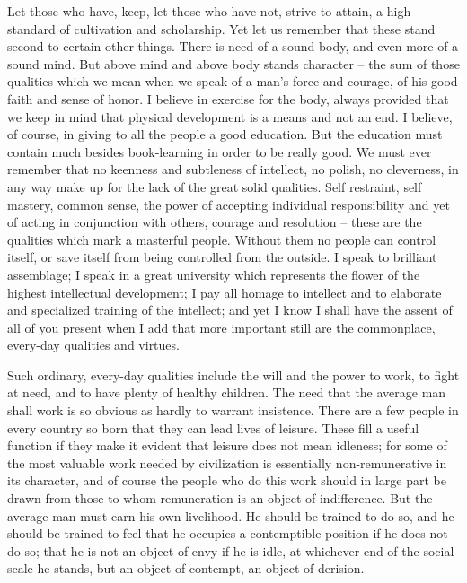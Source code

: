 \documentclass[a4paper]{amsbook}
\begin{document}
Let those who have, keep, let those who have not, strive to attain, a high standard of cultivation and scholarship. Yet let us remember that these stand second to certain other things. There is need of a sound body, and even more of a sound mind. But above mind and above body stands character – the sum of those qualities which we mean when we speak of a man's force and courage, of his good faith and sense of honor. I believe in exercise for the body, always provided that we keep in mind that physical development is a means and not an end. I believe, of course, in giving to all the people a good education. But the education must contain much besides book-learning in order to be really good. We must ever remember that no keenness and subtleness of intellect, no polish, no cleverness, in any way make up for the lack of the great solid qualities. Self restraint, self mastery, common sense, the power of accepting individual responsibility and yet of acting in conjunction with others, courage and resolution – these are the qualities which mark a masterful people. Without them no people can control itself, or save itself from being controlled from the outside. I speak to brilliant assemblage; I speak in a great university which represents the flower of the highest intellectual development; I pay all homage to intellect and to elaborate and specialized training of the intellect; and yet I know I shall have the assent of all of you present when I add that more important still are the commonplace, every-day qualities and virtues.

Such ordinary, every-day qualities include the will and the power to work, to fight at need, and to have plenty of healthy children. The need that the average man shall work is so obvious as hardly to warrant insistence. There are a few people in every country so born that they can lead lives of leisure. These fill a useful function if they make it evident that leisure does not mean idleness; for some of the most valuable work needed by civilization is essentially non-remunerative in its character, and of course the people who do this work should in large part be drawn from those to whom remuneration is an object of indifference. But the average man must earn his own livelihood. He should be trained to do so, and he should be trained to feel that he occupies a contemptible position if he does not do so; that he is not an object of envy if he is idle, at whichever end of the social scale he stands, but an object of contempt, an object of derision.
\end{document}
